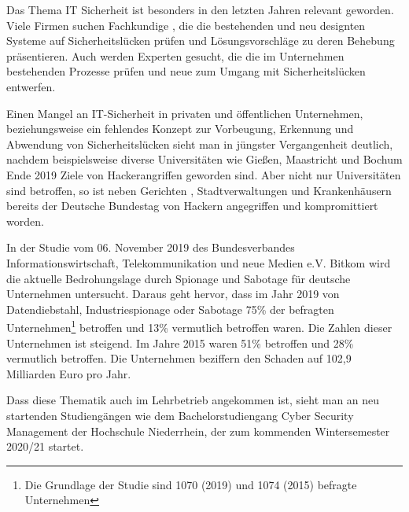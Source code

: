 \label{chap_text:Einleitung}
Das Thema IT Sicherheit ist besonders in den letzten Jahren relevant geworden. Viele Firmen suchen Fachkundige \cite{it-daily.netITSecurityExpertenWerdenHanderingend2019}, die die bestehenden und neu designten Systeme auf Sicherheitslücken prüfen und Lösungsvorschläge zu deren Behebung präsentieren. Auch werden Experten gesucht, die die im Unternehmen bestehenden Prozesse prüfen und neue zum Umgang mit Sicherheitslücken entwerfen.

Einen Mangel an IT-Sicherheit in privaten und öffentlichen Unternehmen, beziehungsweise ein fehlendes Konzept zur Vorbeugung, Erkennung und Abwendung von Sicherheitslücken sieht man in jüngster Vergangenheit deutlich, nachdem beispielsweise diverse Universitäten wie Gießen, Maastricht und Bochum Ende 2019 Ziele von Hackerangriffen geworden sind. \cite{schirmacherUniGiessenNaehert2020}\cite{wdrCyberattackeHackerangriffAuf2019}\cite{ruhr24HackerAngriffLegtITSysteme2020} Aber nicht nur Universitäten sind betroffen, so ist neben Gerichten \cite{hurtzHackerAngriffAufGericht2020}, Stadtverwaltungen\cite{barsigCyberAttackeAufPotsdamer2020} und Krankenhäusern\cite{wellbrockITSicherheitImKrankenhaus2019} bereits der Deutsche Bundestag von Hackern angegriffen und kompromittiert worden. \cite{fladeCyberangriffAufBundestag2020}

In der Studie  vom 06. November 2019 des Bundesverbandes Informationswirtschaft, Telekommunikation und neue Medien e.V. Bitkom wird die aktuelle Bedrohungslage durch Spionage und Sabotage für deutsche Unternehmen untersucht. Daraus geht hervor, dass im Jahr 2019 von Datendiebstahl, Industriespionage oder Sabotage 75\% der befragten Unternehmen\footnote{Die Grundlage der Studie sind 1070 (2019) und 1074 (2015) befragte Unternehmen} betroffen  und 13\% vermutlich betroffen waren. Die Zahlen dieser Unternehmen ist steigend. Im Jahre 2015 waren  51\% betroffen und 28\% vermutlich betroffen. Die Unternehmen beziffern den Schaden auf 102,9 Milliarden Euro pro Jahr. \cite{bergWirtschaftsschutzDigitalenWelt2019}

Dass diese Thematik auch im Lehrbetrieb angekommen ist, sieht man an neu startenden Studiengängen wie dem Bachelorstudiengang Cyber Security Management der Hochschule Niederrhein, der zum kommenden Wintersemester 2020/21 startet. \cite{hochschuleniederrheinHackernRoteKarte2020}

